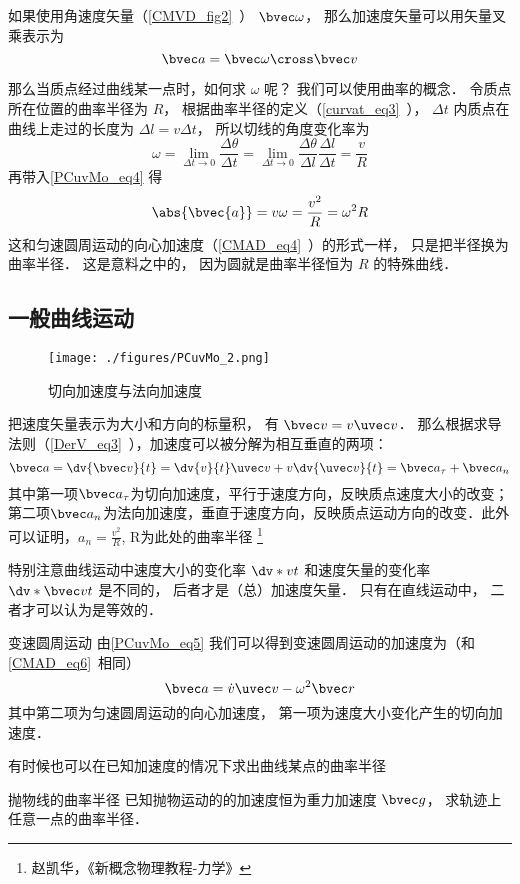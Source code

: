 如果使用角速度矢量（\autoref{CMVD_fig2}~） $\bvec \omega$， 那么加速度矢量可以用矢量叉乘表示为
\begin{equation}
\bvec a = \bvec \omega \cross \bvec v
\end{equation}

那么当质点经过曲线某一点时，如何求 $\omega$ 呢？ 我们可以使用曲率的概念． 令质点所在位置的曲率半径为 $R$， 根据曲率半径的定义（\autoref{curvat_eq3}~）， $\Delta t$ 内质点在曲线上走过的长度为 $\Delta l = v \Delta t$， 所以切线的角度变化率为
\begin{equation}
\omega = \lim_{\Delta t\to 0}\frac{\Delta \theta}{\Delta t} = \lim_{\Delta t\to 0}\frac{\Delta \theta}{\Delta l} \frac{\Delta l}{\Delta t} = \frac{v}{R}
\end{equation}
再带入\autoref{PCuvMo_eq4} 得
\begin{equation}\label{PCuvMo_eq3}
\abs{\bvec{a}} = v\omega = \frac{v^2}{R} = \omega^2 R
\end{equation}
这和匀速圆周运动的向心加速度（\autoref{CMAD_eq4}~）的形式一样， 只是把半径换为曲率半径． 这是意料之中的， 因为圆就是曲率半径恒为 $R$ 的特殊曲线．

\subsection{一般曲线运动}
\begin{figure}[ht]
\centering
\texttt{[image: ./figures/PCuvMo\_2.png]}
\caption{切向加速度与法向加速度} \label{PCuvMo_fig2}
\end{figure}
把速度矢量表示为大小和方向的标量积， 有 $\bvec v = v\uvec v$． 那么根据求导法则（\autoref{DerV_eq3}~），加速度可以被分解为相互垂直的两项：
\begin{equation}\label{PCuvMo_eq5}
\bvec a = \dv{\bvec v}{t} = \dv{v}{t}\uvec v + v\dv{\uvec v}{t} = \bvec a_{\tau}+\bvec a_n
\end{equation}
其中第一项$\bvec a_{\tau}$为切向加速度，平行于速度方向，反映质点速度大小的改变；第二项$\bvec a_n$为法向加速度，垂直于速度方向，反映质点运动方向的改变．此外可以证明，$a_n=\frac{v^2}{R}$, R为此处的曲率半径 \footnote{赵凯华，《新概念物理教程-力学》}

特别注意曲线运动中速度大小的变化率 $\dv*{v}{t}$ 和速度矢量的变化率 $\dv*{\bvec v}{t}$ 是不同的， 后者才是（总）加速度矢量． 只有在直线运动中， 二者才可以认为是等效的．

\begin{example}{变速圆周运动}\label{PCuvMo_ex1}
由\autoref{PCuvMo_eq5} 我们可以得到变速圆周运动的加速度为（和\autoref{CMAD_eq6}~相同）
\begin{equation}
\bvec a = \dot v \uvec v - \omega ^2 \bvec r
\end{equation}
其中第二项为匀速圆周运动的向心加速度， 第一项为速度大小变化产生的切向加速度．
\end{example}

有时候也可以在已知加速度的情况下求出曲线某点的曲率半径
\begin{exercise}{抛物线的曲率半径}
已知抛物运动的的加速度恒为重力加速度 $\bvec g$， 求轨迹上任意一点的曲率半径．
\end{exercise}
